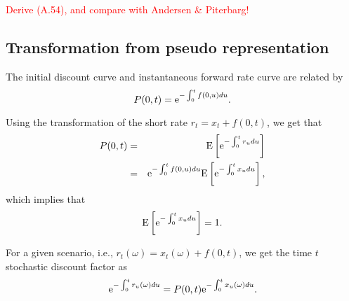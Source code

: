 \textcolor{red}{Derive (A.54), and compare with Andersen \& Piterbarg!}

\subsection{Transformation from pseudo representation}

The initial discount curve and instantaneous forward rate curve are related by
\begin{equation}
P(0,t) = \text{e}^{- \int_0^t f(0,u) du}.
\end{equation}

Using the transformation of the short rate $r_t = x_t + f(0,t)$, we get that
\begin{eqnarray}
P(0,t) &=& \mathrm{E} \left[ \text{e}^{- \int_0^t r_u du} \right] \\
&=& \text{e}^{- \int_0^t f(0,u) du} \mathrm{E} \left[ \text{e}^{- \int_0^t x_u du} \right],
\end{eqnarray}
which implies that
\begin{equation}
\mathrm{E} \left[ \text{e}^{- \int_0^t x_u du} \right] = 1.
\end{equation}

For a given scenario, i.e., $r_t(\omega) = x_t (\omega) + f(0,t)$, we get the 
time $t$ stochastic discount factor as
\begin{equation}
\text{e}^{- \int_0^t r_u (\omega) du} = P(0,t) \text{e}^{- \int_0^t x_u (\omega) du}.
\end{equation}